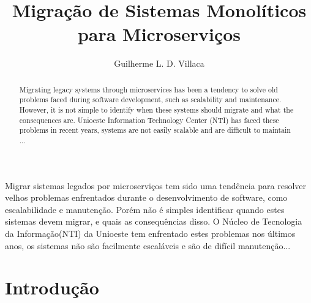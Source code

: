 \documentclass[12pt]{article}
\title{Migração de Sistemas Monolíticos para Microserviços}
\author{Guilherme L. D. Villaca\inst{1}}
\begin{document}
 

\maketitle

\begin{abstract}
Migrating legacy systems through microservices has been a tendency to solve old problems faced during software development, such as scalability and maintenance. However, it is not simple to identify when these systems should migrate and what the consequences are. Unioeste Information Technology Center (NTI) has faced these problems in recent years, systems are not easily scalable and are difficult to maintain ...
\end{abstract}
     
\begin{resumo} 
Migrar sistemas legados por microserviços tem sido uma tendência para resolver velhos problemas enfrentados durante o desenvolvimento de software, como escalabilidade e manutenção. Porém não é simples identificar quando estes sistemas devem migrar, e quais as consequências disso. O Núcleo de Tecnologia da Informação(NTI) da Unioeste tem enfrentado estes problemas nos últimos anos, os sistemas não são facilmente escaláveis e são de difícil manutenção...
\end{resumo}


\section{Introdução}

\end{document}
